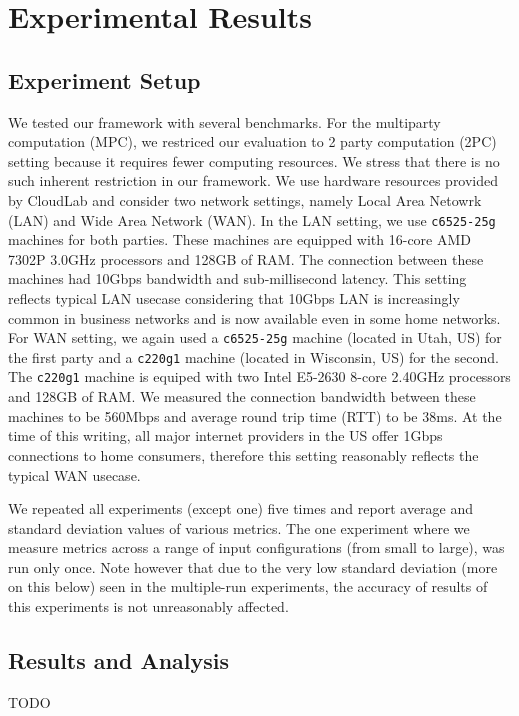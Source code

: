 \section{Experimental Results}
\label{sec:results}

\subsection{Experiment Setup}\label{sec:experiment_setup}
We tested our framework with several benchmarks. For the multiparty computation (MPC), we restriced our evaluation to 2 party computation (2PC) setting because it requires fewer computing resources. We stress that there is no such inherent restriction in our framework. We use hardware resources provided by CloudLab\cite{DuplyakinATC19} and consider two network settings, namely Local Area Netowrk (LAN) and Wide Area Network (WAN). In the LAN setting, we use \texttt{c6525-25g} machines for both parties. These machines are equipped with 16-core AMD 7302P 3.0GHz processors and 128GB of RAM. The connection between these machines had 10Gbps bandwidth and sub-millisecond latency. This setting reflects typical LAN usecase considering that 10Gbps LAN is increasingly common in business networks and is now available even in some home networks. For WAN setting, we again used a \texttt{c6525-25g} machine (located in Utah, US) for the first party and a \texttt{c220g1} machine (located in Wisconsin, US) for the second. The \texttt{c220g1} machine is equiped with two Intel E5-2630 8-core 2.40GHz processors and 128GB of RAM. We measured the connection bandwidth between these machines to be 560Mbps and average round trip time (RTT) to be 38ms. At the time of this writing, all major internet providers in the US offer 1Gbps connections to home consumers, therefore this setting reasonably reflects the typical WAN usecase.

We repeated all experiments (except one) five times and report average and standard deviation values of various metrics. The one experiment where we measure metrics across a range of input configurations (from small to large), was run only once. Note however that due to the very low standard deviation (more on this below) seen in the multiple-run experiments, the accuracy of results of this experiments is not unreasonably affected.

\subsection{Results and Analysis}\label{sec:result_analysis}
TODO

